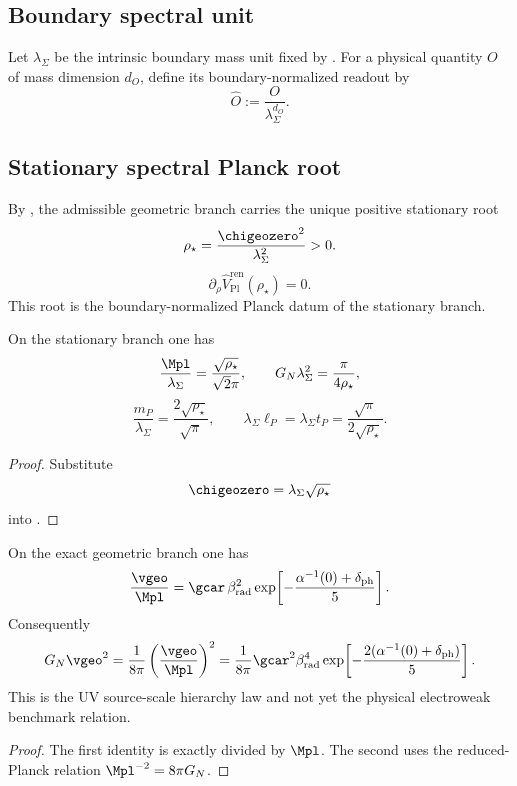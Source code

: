 \subsection{Boundary spectral unit}

\begin{definition}
\label{def:boundary-spectral-unit}
Let $\lambda_\Sigma$ be the intrinsic boundary mass unit fixed by
. For a physical quantity $O$ of mass dimension $d_O$,
define its boundary-normalized readout by
\[
\widehat O:=\frac{O}{\lambda_\Sigma^{d_O}}.
\]
\end{definition}

\subsection{Stationary spectral Planck root}

\begin{corollary}
\label{thm:unique-stationary-spectral-planck-root}
By , the admissible geometric branch carries the unique
positive stationary root
\[
\rho_\star=\frac{\chigeozero^2}{\lambda_\Sigma^2}>0.
\]
\[
\partial_\rho\widehat V_{\mathrm{Pl}}^{\mathrm{ren}}(\rho_\star)=0.
\]
This root is the boundary-normalized Planck datum of the stationary branch.
\end{corollary}

\begin{corollary}
\label{cor:dimensionless-planck-metrology}
On the stationary branch one has
\[
\frac{\Mpl}{\lambda_\Sigma}
=
\frac{\sqrt{\rho_\star}}{\sqrt2\pi},
\qquad
G_N\lambda_\Sigma^2
=
\frac{\pi}{4\rho_\star},
\]
\[
\frac{m_P}{\lambda_\Sigma}
=
\frac{2\sqrt{\rho_\star}}{\sqrt\pi},
\qquad
\lambda_\Sigma\ell_P=\lambda_\Sigma t_P
=
\frac{\sqrt\pi}{2\sqrt{\rho_\star}}.
\]
\end{corollary}

\begin{proof}
Substitute
\[
\chigeozero=\lambda_\Sigma\sqrt{\rho_\star}
\]
into .
\end{proof}

\begin{corollary}
\label{cor:dimensionless-geometric-hierarchy}
On the exact geometric branch one has
\[
\frac{\vgeo}{\Mpl}
=
\gcar\,\beta_{\mathrm{rad}}^2
\exp\!\left[-\frac{\alpha^{-1}(0)+\delta_{\mathrm{ph}}}{5}\right].
\]
Consequently
\[
G_N\vgeo^2
=
\frac{1}{8\pi}
\left(\frac{\vgeo}{\Mpl}\right)^2
=
\frac{1}{8\pi}\gcar^2\beta_{\mathrm{rad}}^4
\exp\!\left[-\frac{2(\alpha^{-1}(0)+\delta_{\mathrm{ph}})}{5}\right].
\]
This is the UV source-scale hierarchy law and not yet the physical electroweak benchmark relation.
\end{corollary}

\begin{proof}
The first identity is exactly  divided by $\Mpl$. The second uses the
reduced-Planck relation $\Mpl^{-2}=8\pi G_N$.
\end{proof}

